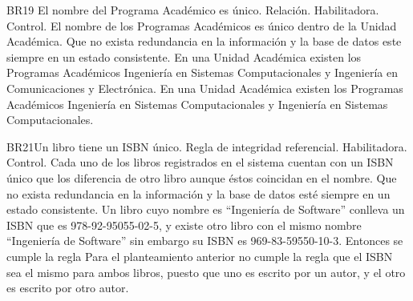 \begin{BussinesRule}{BR19} {El nombre del Programa Académico es único.}
    \BRitem[Tipo: ]Relación.
    \BRitem[Clase: ]Habilitadora.
    \BRitem[Nivel: ]Control.
    \BRitem[Descripción: ]El nombre de los Programas Académicos es único dentro de la Unidad Académica.
    \BRitem[Motivación: ] Que no exista redundancia en la información y la base de datos este siempre en un estado consistente.
     En una Unidad Académica existen los Programas Académicos Ingeniería en Sistemas Computacionales y Ingeniería en Comunicaciones y Electrónica.
    En una Unidad Académica existen los Programas Académicos Ingeniería en Sistemas Computacionales y Ingeniería en Sistemas Computacionales.
\end{BussinesRule}
\begin{BussinesRule}{BR21}{Un libro tiene un ISBN único.}
    \BRitem[Tipo:] Regla de integridad referencial.
    \BRitem[Clase:] Habilitadora.
    \BRitem[Nivel:] Control.
    \BRitem[Descripción:] Cada uno de los libros registrados en el sistema cuentan con un ISBN único que los diferencia de otro libro aunque éstos coincidan en el nombre.
    \BRitem[Motivación:] Que no exista redundancia en la información y la base de datos esté siempre en un estado consistente.
     Un libro cuyo nombre es ``Ingeniería de Software'' conlleva un ISBN que es 978-92-95055-02-5, y existe otro libro con el mismo nombre ``Ingeniería de Software'' sin embargo su ISBN es 969-83-59550-10-3. Entonces se cumple la regla
     Para el planteamiento anterior no cumple la regla que el ISBN sea el mismo para ambos libros, puesto que uno es escrito por un autor, y el otro es escrito por otro autor.
\end{BussinesRule}
